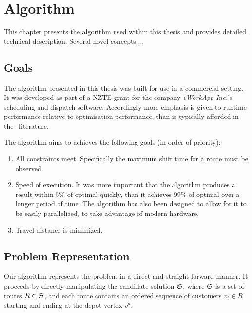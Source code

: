 
\chapter{Algorithm}

This chapter presents the algorithm used within this thesis and provides detailed technical description. Several novel concepts ... 


\section{Goals}
The algorithm presented in this thesis was built for use in a commercial setting. It was developed as part of a NZTE grant for the company \emph{vWorkApp Inc.}'s scheduling and dispatch software. Accordingly more emphasis is given to runtime performance relative to optimisation performance, than is typically afforded in the \VRP\ literature.
 
The algorithm aims to achieves the following goals (in order of priority):

\begin{enumerate}
   \item All constraints meet. Specifically the maximum shift time for a route must be observed.
   \item Speed of execution. It was more important that the algorithm produces a result within 5\% of optimal quickly, than it achieves 99\% of optimal over a longer period of time. The algorithm has also been designed to allow for it to be easily parallelized, to take advantage of modern hardware.
   \item Travel distance is minimized.
\end{enumerate}

\section{Problem Representation}

Our algorithm represents the problem in a direct and straight forward manner. It proceeds by directly manipulating the candidate solution $\mathfrak{S}$, where $\mathfrak{S}$ is a set of routes $R \in \mathfrak{S}$, and each route contains an ordered sequence of customers $v_i \in R$ starting and ending at the depot vertex $v^d$.

